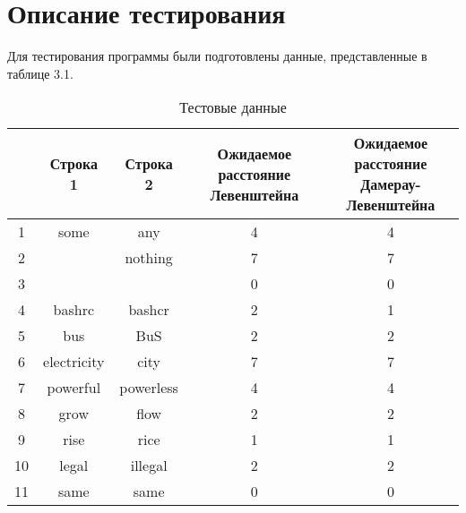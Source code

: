 \section{Описание тестирования}
Для тестирования программы были подготовлены данные, представленные в таблице 3.1.

\begin{table}[H]
    \caption{Тестовые данные}
	\begin{tabular}{|c|c|c|c|c|}
 	\hline
    \No{} & Строка 1 & Строка 2 & \makecell{Ожидаемое расстояние\\Левенштейна} & \makecell{Ожидаемое расстояние\\Дамерау-Левенштейна} \\
 	\hline
 	1 & some & any & 4 & 4\\
 	\hline
 	2 & & nothing & 7 & 7\\
 	\hline
 	3 & & & 0 & 0\\
 	\hline
 	4 & bashrc & bashcr & 2 & 1\\
 	\hline
 	5 & bus & BuS & 2 & 2\\
 	\hline
 	6 & electricity & city & 7 & 7\\
 	\hline
 	7 & powerful & powerless & 4 & 4\\
 	\hline
 	8 & grow & flow & 2 & 2\\
 	\hline
 	9 & rise & rice & 1 & 1\\
 	\hline
    10 & legal & illegal & 2 & 2\\
 	\hline
    11 & same & same & 0 & 0\\
    \hline
	\end{tabular}
\end{table}

